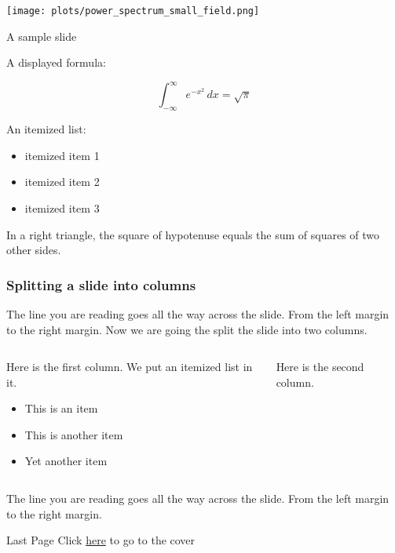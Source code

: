 \documentclass[xcolor=dvipsnames]{beamer}
\begin{document}
\begin{frame}
\texttt{[image: plots/power\_spectrum\_small\_field.png]}
\end{frame}

\begin{frame}{A sample slide}

A displayed formula:

\[
  \int_{-\infty}^\infty e^{-x^2} \, dx = \sqrt{\pi}
\]

\pause
An itemized list:

\begin{itemize}
  \item itemized item 1
  \item itemized item 2
  \item itemized item 3
\end{itemize}

\pause
\begin{theorem}
  In a right triangle, the square of hypotenuse equals
  the sum of squares of two other sides.
\end{theorem}

\end{frame}

\begin{frame}
  \frametitle{Splitting a slide into columns}

The line you are reading goes all the way across the slide.
From the left margin to the right margin.  Now we are going
the split the slide into two columns.
\bigskip

\begin{columns}[t]

\pause
  \begin{column}{0.5\textwidth}
    Here is the first column.  We put an itemized list in it.
    \begin{itemize}
      \item This is an item
      \item This is another item
      \item Yet another item
    \end{itemize}
  \end{column}

\pause
  \begin{column}{0.3\textwidth}
    Here is the second column.  
    \end{column}
\end{columns}
\bigskip

\pause
The line you are reading goes all the way across the slide.
From the left margin to the right margin.

\end{frame}

\begin{frame}{Last Page}
Click \hyperlink{cover}{here} to go to the cover
\end{frame}
\end{document}
